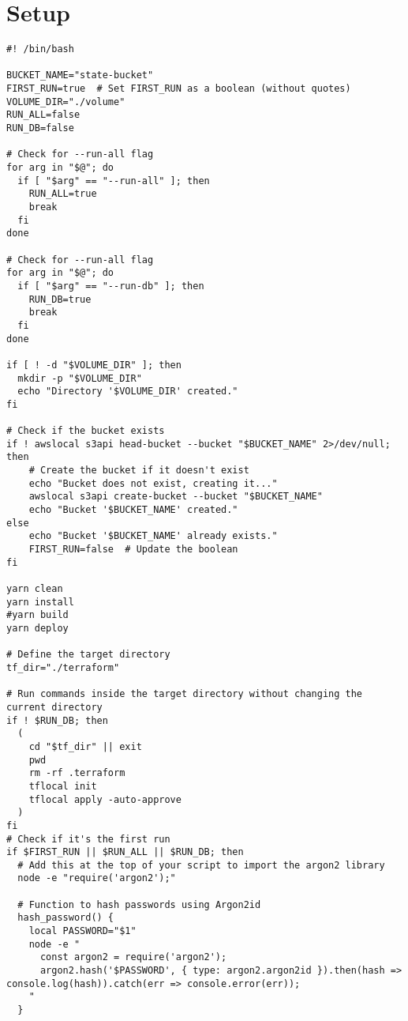 \appendix
\chapter{Setup}
\begin{lstlisting}[style=bashstyle,caption=Build and run script,label=apendix:build_and_run_script]
#! /bin/bash

BUCKET_NAME="state-bucket"
FIRST_RUN=true  # Set FIRST_RUN as a boolean (without quotes)
VOLUME_DIR="./volume"
RUN_ALL=false
RUN_DB=false

# Check for --run-all flag
for arg in "$@"; do
  if [ "$arg" == "--run-all" ]; then
    RUN_ALL=true
    break
  fi
done

# Check for --run-all flag
for arg in "$@"; do
  if [ "$arg" == "--run-db" ]; then
    RUN_DB=true
    break
  fi
done

if [ ! -d "$VOLUME_DIR" ]; then
  mkdir -p "$VOLUME_DIR"
  echo "Directory '$VOLUME_DIR' created."
fi

# Check if the bucket exists
if ! awslocal s3api head-bucket --bucket "$BUCKET_NAME" 2>/dev/null; then
    # Create the bucket if it doesn't exist
    echo "Bucket does not exist, creating it..."
    awslocal s3api create-bucket --bucket "$BUCKET_NAME"
    echo "Bucket '$BUCKET_NAME' created."
else
    echo "Bucket '$BUCKET_NAME' already exists."
    FIRST_RUN=false  # Update the boolean
fi

yarn clean
yarn install
#yarn build
yarn deploy

# Define the target directory
tf_dir="./terraform"

# Run commands inside the target directory without changing the current directory
if ! $RUN_DB; then
  (
    cd "$tf_dir" || exit
    pwd
    rm -rf .terraform
    tflocal init
    tflocal apply -auto-approve
  )
fi
# Check if it's the first run
if $FIRST_RUN || $RUN_ALL || $RUN_DB; then
  # Add this at the top of your script to import the argon2 library
  node -e "require('argon2');"

  # Function to hash passwords using Argon2id
  hash_password() {
    local PASSWORD="$1"
    node -e "
      const argon2 = require('argon2');
      argon2.hash('$PASSWORD', { type: argon2.argon2id }).then(hash => console.log(hash)).catch(err => console.error(err));
    "
  }


\end{lstlisting}

